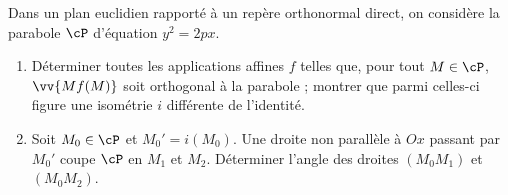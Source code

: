 \begin{enonce}
\begin{exercise}[ID={Cahier RMS4 164 (Mines)},subtitle={},tags={}, difficulty={0}]
Dans un plan euclidien rapporté à un repère orthonormal direct, on considère la parabole $\cP$ d'équation $y^2=2px$.
\begin{enumerate}
  \item Déterminer toutes les applications affines $f$ telles que, pour tout $M\in \cP$, $\vv{Mf(M)}$ soit orthogonal à la parabole ; montrer que parmi celles-ci figure une isométrie $i$ différente de l'identité.
  \item
    Soit $M_0\in\cP$ et $M_0'=i(M_0)$.
    Une droite non parallèle à $Ox$ passant par $M_0'$ coupe $\cP$ en $M_1$ et $M_2$.
    Déterminer l'angle des droites $(M_0M_1)$ et $(M_0M_2)$.
\end{enumerate}
\end{exercise}
\begin{solution}
\end{solution}
\end{enonce}
